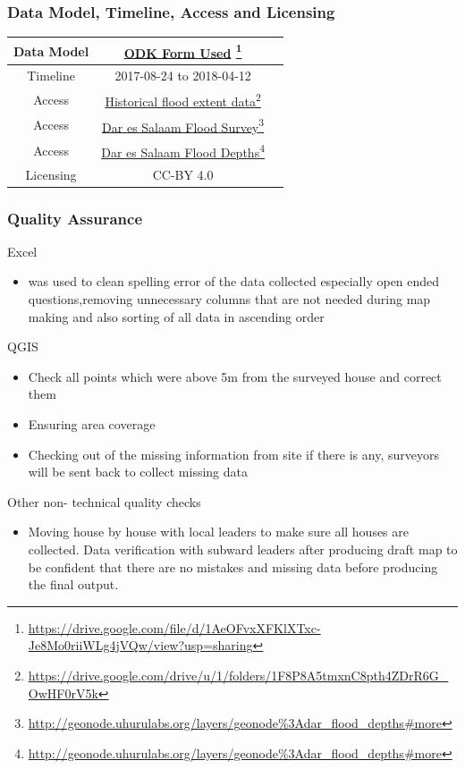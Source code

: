 \documentclass[a4paper,12pt,twoside]{article}
\begin{document}
\medskip
\subsubsection{Data Model, Timeline, Access and Licensing}
\begin{center}
\begin{tabular}{|c|c|c|}  
\hline
Data Model &  \href{https://drive.google.com/file/d/1AeOFvxXFKlXTxc-Je8Mo0riiWLg4jVQw/view?usp=sharing
}{ODK Form Used} \footnote{\url{https://drive.google.com/file/d/1AeOFvxXFKlXTxc-Je8Mo0riiWLg4jVQw/view?usp=sharing}} \\
 \hline
  Timeline  &  2017-08-24 to 2018-04-12 \\
\hline  
 Access  & 
    \href{https://drive.google.com/drive/u/1/folders/1F8P8A5tmxnC8pth4ZDrR6G_OwHF0rV5k}{Historical flood extent data}\footnote{\url{https://drive.google.com/drive/u/1/folders/1F8P8A5tmxnC8pth4ZDrR6G_OwHF0rV5k}}\\
Access & 
    \href{http://geonode.uhurulabs.org/layers/geonode\%3Adar_flood_depths#more}{Dar es Salaam Flood Survey}\footnote{\url{http://geonode.uhurulabs.org/layers/geonode\%3Adar_flood_depths#more}}\\
 Access &    
     \href{http://geonode.uhurulabs.org/layers/geonode\%3Adar_flood_depths#more}{Dar es Salaam Flood Depths}\footnote{\url{http://geonode.uhurulabs.org/layers/geonode\%3Adar_flood_depths#more}} \\
\hline
Licensing   &  CC-BY 4.0 \\
\hline
\end{tabular}
\end{center}

\subsubsection{Quality Assurance}
    \large{Excel}
    \begin{itemize}
    \item was used  to clean spelling error of the data collected especially open ended questions,removing unnecessary columns that are not needed during map making and also sorting of all data in ascending order
    \end{itemize}
    \large{QGIS}
    \begin{itemize}
        \item Check all points which  were above 5m from the surveyed house and correct them
        \item Ensuring area coverage
        \item Checking out of the missing information from site if there is any, surveyors will be sent back to collect missing data
    \end{itemize}
    \large{Other non- technical quality checks}
    \begin{itemize}
        \item Moving house by house with local leaders to make sure all houses are collected.
Data verification with subward leaders after producing draft map to be confident that there are no mistakes and missing data before producing the final output.
    \end{itemize}
\end{document}
